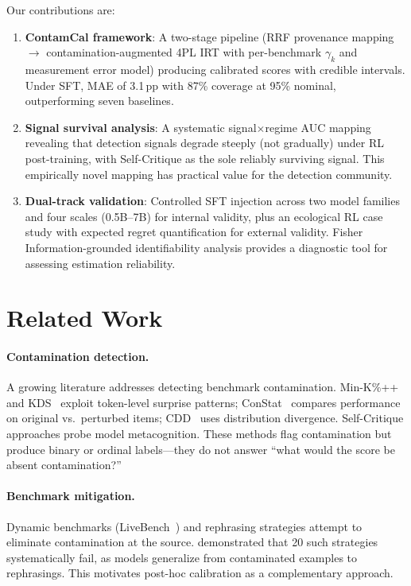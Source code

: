 \documentclass[letterpaper]{article}
\begin{document}
Our contributions are:
\begin{enumerate}[leftmargin=*,itemsep=2pt]
\item \textbf{ContamCal framework}: A two-stage pipeline (RRF provenance mapping $\to$ contamination-augmented 4PL IRT with per-benchmark $\gamma_k$ and measurement error model) producing calibrated scores with credible intervals. Under SFT, MAE of 3.1\,pp with 87\% coverage at 95\% nominal, outperforming seven baselines.
\item \textbf{Signal survival analysis}: A systematic signal$\times$regime AUC mapping revealing that detection signals degrade steeply (not gradually) under RL post-training, with Self-Critique as the sole reliably surviving signal. This empirically novel mapping has practical value for the detection community.
\item \textbf{Dual-track validation}: Controlled SFT injection across two model families and four scales (0.5B--7B) for internal validity, plus an ecological RL case study with expected regret quantification for external validity. Fisher Information-grounded identifiability analysis provides a diagnostic tool for assessing estimation reliability.
\end{enumerate}

\section{Related Work}
\label{sec:related}

\paragraph{Contamination detection.}
A growing literature addresses detecting benchmark contamination.
Min-K\%++~\citep{shi2024detecting} and KDS~\citep{duan2024membership} exploit token-level surprise patterns; ConStat~\citep{dekoninck2024constat} compares performance on original vs.\ perturbed items; CDD~\citep{dong2024generalization} uses distribution divergence.
Self-Critique approaches probe model metacognition.
These methods flag contamination but produce binary or ordinal labels---they do not answer ``what would the score be absent contamination?''

\paragraph{Benchmark mitigation.}
Dynamic benchmarks (LiveBench~\citep{white2024livebench}) and rephrasing strategies attempt to eliminate contamination at the source.
\citet{xu2024benchmarking} demonstrated that 20 such strategies systematically fail, as models generalize from contaminated examples to rephrasings.
This motivates post-hoc calibration as a complementary approach.
\end{document}
